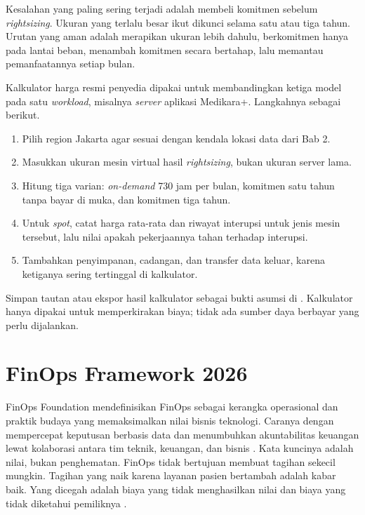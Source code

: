 Kesalahan yang paling sering terjadi adalah membeli komitmen sebelum \textit{rightsizing}. Ukuran
yang terlalu besar ikut dikunci selama satu atau tiga tahun. Urutan yang aman adalah merapikan
ukuran lebih dahulu, berkomitmen hanya pada lantai beban, menambah komitmen secara bertahap, lalu
memantau pemanfaatannya setiap bulan.

\begin{pendalaman}[title={Pendalaman Teknis (opsional): Kalkulator Harga untuk Tiga Model}]
  Kalkulator harga resmi penyedia dipakai untuk membandingkan ketiga model pada satu
  \textit{workload}, misalnya \textit{server} aplikasi Medikara+. Langkahnya sebagai berikut.
  \begin{enumerate}
    \item Pilih region Jakarta agar sesuai dengan kendala lokasi data dari Bab 2.
    \item Masukkan ukuran mesin virtual hasil \textit{rightsizing}, bukan ukuran server lama.
    \item Hitung tiga varian: \textit{on-demand} 730 jam per bulan, komitmen satu tahun tanpa bayar
          di muka, dan komitmen tiga tahun.
    \item Untuk \textit{spot}, catat harga rata-rata dan riwayat interupsi untuk jenis mesin
          tersebut, lalu nilai apakah pekerjaannya tahan terhadap interupsi.
    \item Tambahkan penyimpanan, cadangan, dan transfer data keluar, karena ketiganya sering
          tertinggal di kalkulator.
  \end{enumerate}
  Simpan tautan atau ekspor hasil kalkulator sebagai bukti asumsi di
  . Kalkulator hanya dipakai untuk
  memperkirakan biaya; tidak ada sumber daya berbayar yang perlu dijalankan.
\end{pendalaman}

\section{FinOps Framework 2026}

FinOps Foundation mendefinisikan FinOps sebagai kerangka operasional dan praktik budaya yang
memaksimalkan nilai bisnis teknologi. Caranya dengan mempercepat keputusan berbasis data dan
menumbuhkan akuntabilitas keuangan lewat kolaborasi antara tim teknik, keuangan, dan bisnis
\cite{finops2026}. Kata kuncinya adalah nilai, bukan penghematan. FinOps tidak bertujuan membuat
tagihan sekecil mungkin. Tagihan yang naik karena layanan pasien bertambah adalah kabar baik. Yang
dicegah adalah biaya yang tidak menghasilkan nilai dan biaya yang tidak diketahui pemiliknya
\cite{storment2023}.

